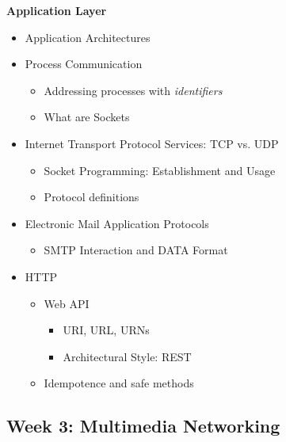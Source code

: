 \documentclass[a4paper]{article}
\begin{document}
\newpage
\noindent\textbf{Application Layer}
\begin{itemize}[label=$\square$]
    \item Application Architectures
    \item Process Communication
    \begin{itemize}[label=$\square$]
        \item Addressing processes with \textit{identifiers}
        \item What are Sockets
    \end{itemize}
    \item Internet Transport Protocol Services: TCP vs. UDP
    \begin{itemize}[label=$\square$]
        \item Socket Programming: Establishment and Usage
        \item Protocol definitions
    \end{itemize}
    \item Electronic Mail Application Protocols
    \begin{itemize}[label=$\square$]
        \item SMTP Interaction and DATA Format
    \end{itemize}
    \item HTTP
    \begin{itemize}[label=$\square$]
        \item Web API
        \begin{itemize}[label=$\square$]
            \item URI, URL, URNs
            \item Architectural Style: REST
        \end{itemize}
        \item Idempotence and safe methods
    \end{itemize}
\end{itemize}

\subsection*{Week 3: Multimedia Networking}
\end{document}

